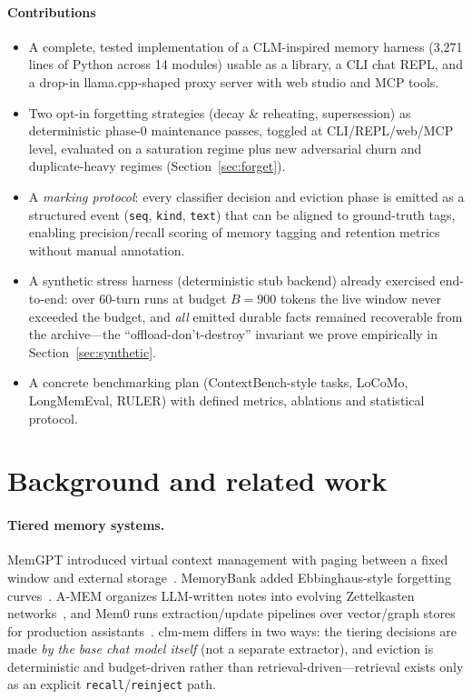 \documentclass[10pt]{article}
\begin{document}
\paragraph{Contributions}
\begin{itemize}
\item A complete, tested implementation of a CLM-inspired memory harness (3{,}271 lines of Python across 14 modules) usable as a library, a CLI chat REPL, and a drop-in llama.cpp-shaped proxy server with web studio and MCP tools.
\item Two opt-in forgetting strategies (decay \& reheating, supersession) as deterministic phase-0 maintenance passes, toggled at CLI/REPL/web/MCP level, evaluated on a saturation regime plus new adversarial churn and duplicate-heavy regimes (Section~\ref{sec:forget}).
\item A \emph{marking protocol}: every classifier decision and eviction phase is emitted as a structured event (\texttt{seq}, \texttt{kind}, \texttt{text}) that can be aligned to ground-truth tags, enabling precision/recall scoring of memory tagging and retention metrics without manual annotation.
\item A synthetic stress harness (deterministic stub backend) already exercised end-to-end: over 60-turn runs at budget $B=900$ tokens the live window never exceeded the budget, and \emph{all} emitted durable facts remained recoverable from the archive---the ``offload-don't-destroy'' invariant we prove empirically in Section~\ref{sec:synthetic}.
\item A concrete benchmarking plan (ContextBench-style tasks, LoCoMo, LongMemEval, RULER) with defined metrics, ablations and statistical protocol.
\end{itemize}

\section{Background and related work}
\paragraph{Tiered memory systems.} MemGPT introduced virtual context management with paging between a fixed window and external storage~\cite{memgpt}. MemoryBank added Ebbinghaus-style forgetting curves~\cite{memorybank}. A-MEM organizes LLM-written notes into evolving Zettelkasten networks~\cite{amem}, and Mem0 runs extraction/update pipelines over vector/graph stores for production assistants~\cite{mem0}. clm-mem differs in two ways: the tiering decisions are made \emph{by the base chat model itself} (not a separate extractor), and eviction is deterministic and budget-driven rather than retrieval-driven---retrieval exists only as an explicit \texttt{recall}/\texttt{reinject} path.
\end{document}
